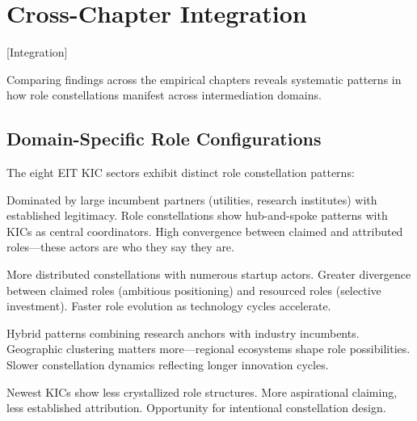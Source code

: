 \documentclass[../main.tex]{subfiles}
\begin{document}
\section{Cross-Chapter Integration}[Integration]

Comparing findings across the empirical chapters reveals systematic patterns in how role constellations manifest across intermediation domains.

\subsection{Domain-Specific Role Configurations}

The eight EIT KIC sectors exhibit distinct role constellation patterns:

\begin{description}[leftmargin=0.5cm, itemsep=0.3em]
\item[Climate and Energy] Dominated by large incumbent partners (utilities, research institutes) with established legitimacy. Role constellations show hub-and-spoke patterns with KICs as central coordinators. High convergence between claimed and attributed roles---these actors are who they say they are.

\item[Health and Digital] More distributed constellations with numerous startup actors. Greater divergence between claimed roles (ambitious positioning) and resourced roles (selective investment). Faster role evolution as technology cycles accelerate.

\item[Food and Raw Materials] Hybrid patterns combining research anchors with industry incumbents. Geographic clustering matters more---regional ecosystems shape role possibilities. Slower constellation dynamics reflecting longer innovation cycles.

\item[Urban Mobility and Manufacturing] Newest KICs show less crystallized role structures. More aspirational claiming, less established attribution. Opportunity for intentional constellation design.
\end{description}
\end{document}
